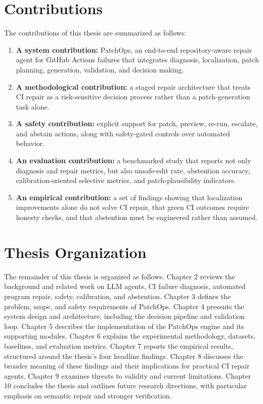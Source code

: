 \section{Contributions}

The contributions of this thesis are summarized as follows:

\begin{enumerate}
\item \textbf{A system contribution:} PatchOps, an end-to-end repository-aware repair agent for GitHub Actions
failures that integrates diagnosis, localization, patch planning, generation, validation, and decision making.
\item \textbf{A methodological contribution:} a staged repair architecture that treats CI repair as a
risk-sensitive decision process rather than a patch-generation task alone.
\item \textbf{A safety contribution:} explicit support for patch, preview, re-run, escalate, and abstain actions,
along with safety-gated controls over automated behavior.
\item \textbf{An evaluation contribution:} a benchmarked study that reports not only diagnosis and repair
metrics, but also unsafe-edit rate, abstention accuracy, calibration-oriented selective metrics, and
patch-plausibility indicators.
\item \textbf{An empirical contribution:} a set of findings showing that localization improvements alone do not
solve CI repair, that green CI outcomes require honesty checks, and that abstention must be engineered rather
than assumed.
\end{enumerate}

\section{Thesis Organization}

The remainder of this thesis is organized as follows. Chapter 2 reviews the background and related work on LLM
agents, CI failure diagnosis, automated program repair, safety, calibration, and abstention. Chapter 3 defines
the problem, scope, and safety requirements of PatchOps. Chapter 4 presents the system design and architecture,
including the decision pipeline and validation loop. Chapter 5 describes the implementation of the PatchOps
engine and its supporting modules. Chapter 6 explains the experimental methodology, datasets, baselines, and
evaluation metrics. Chapter 7 reports the empirical results, structured around the thesis's four headline
findings. Chapter 8 discusses the broader meaning of these findings and their implications for practical CI
repair agents. Chapter 9 examines threats to validity and current limitations. Chapter 10 concludes the thesis
and outlines future research directions, with particular emphasis on semantic repair and stronger verification.

